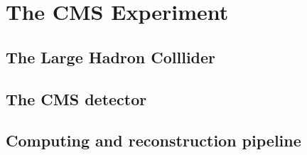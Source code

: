 \chapter{The CMS Experiment}

\section{The Large Hadron Colllider}

\section{The CMS detector}
\label{sec:cms_det}

\section{Computing and reconstruction pipeline}
